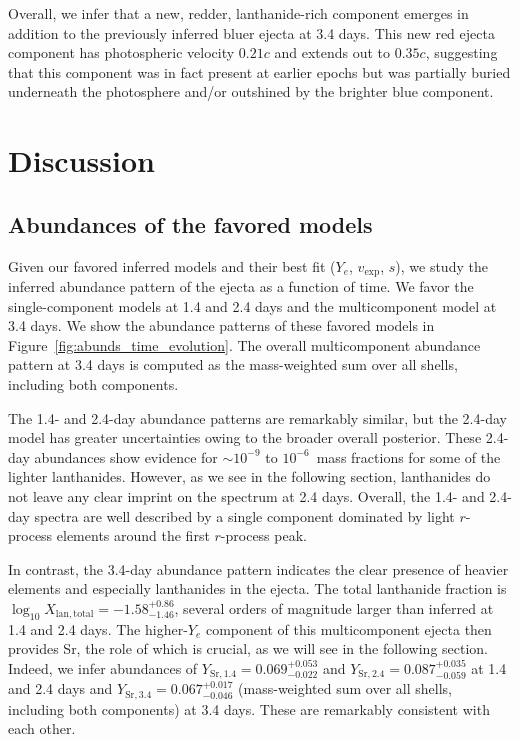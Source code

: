 \documentclass[twocolumn,twocolappendix]{aastex63}
\begin{document}
{{{{{{Overall, we infer that a new, redder, lanthanide-rich component emerges in addition to the previously inferred bluer ejecta at 3.4 days. This new red ejecta component has photospheric velocity $0.21c$ and extends out to $0.35c$, suggesting that this component was in fact present at earlier epochs but was partially buried underneath the photosphere and/or outshined by the brighter blue component.






\section{Discussion}\label{sec:disco}

\subsection{Abundances of the favored models}\label{ssc:disco-abundances}

Given our favored inferred models and their best fit ($Y_e$, $v_{\mathrm{exp}}$, $s$), we study the inferred abundance pattern of the ejecta as a function of time. We favor the single-component models at 1.4 and 2.4 days and the multicomponent model at 3.4 days. We show the abundance patterns of these favored models in Figure~\ref{fig:abunds_time_evolution}. The overall multicomponent abundance pattern at 3.4 days is computed as the mass-weighted sum over all shells, including both components. 

The 1.4- and 2.4-day abundance patterns are remarkably similar, but the 2.4-day model has greater uncertainties owing to the broader overall posterior. These 2.4-day abundances show evidence for $\sim$$10^{-9}$ to $10^{-6}$~mass fractions for some of the lighter lanthanides. However, as we see in the following section, lanthanides do not leave any clear imprint on the spectrum at 2.4 days. Overall, the 1.4- and 2.4-day spectra are well described by a single component dominated by light $r$-process elements around the first $r$-process peak.

In contrast, the 3.4-day abundance pattern indicates the clear presence of heavier elements and especially lanthanides in the ejecta. The total lanthanide fraction is $\log_{10} X_{\mathrm{lan,total}} = -1.58^{+0.86}_{-1.46}$, several orders of magnitude larger than inferred at 1.4 and 2.4 days. The higher-$Y_e$ component of this multicomponent ejecta then provides Sr, the role of which is crucial, as we will see in the following section. Indeed, we infer abundances of $Y_{\mathrm{Sr},1.4} = 0.069^{+0.053}_{-0.022}$ and $Y_{\mathrm{Sr},2.4} = 0.087^{+0.035}_{-0.059}$ at 1.4 and 2.4 days and $Y_{\mathrm{Sr},3.4} = 0.067^{+0.017}_{-0.046}$ (mass-weighted sum over all shells, including both components) at 3.4 days. These are remarkably consistent with each other.

}}}}}}
\end{document}
